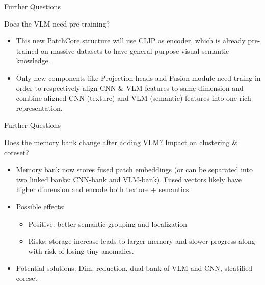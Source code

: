 \begin{frame}{Further Questions}
    \begin{block}{Does the VLM need pre-training?}
        \begin{itemize}
            \item This new PatchCore structure will use CLIP as encoder, which is already pre-trained on massive datasets to have general-purpose visual-semantic knowledge.
            \item Only new components like Projection heads  and Fusion module need traing in order to respectively align CNN & VLM features to same dimension and combine aligned CNN (texture) and VLM (semantic) features into one rich representation.
        \end{itemize}
    \end{block}
\end{frame}

\begin{frame}{Further Questions}
\begin{block}{Does the memory bank change after adding VLM? Impact on clustering & coreset?}
    \begin{itemize}
        \item Memory bank now stores fused patch embeddings (or can be separated into two linked banks: CNN-bank and VLM-bank). Fused vectors likely have higher dimension and encode both texture + semantics.
        \item Possible effects:
        \begin{itemize}
            \item Positive: better semantic grouping and localization
            \item Risks: storage increase leads to larger memory and slower progress along with risk of losing tiny anomalies.
        \end{itemize}
        \item Potential solutions: Dim. reduction, dual-bank of VLM and CNN, stratified coreset
    \end{itemize}
\end{block}
\end{frame}